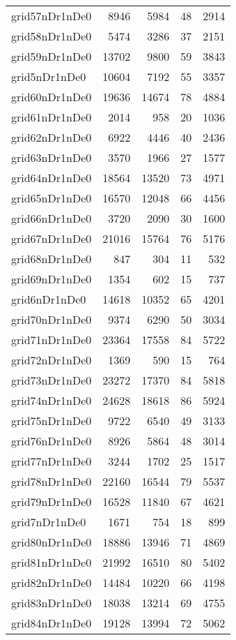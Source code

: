 \begin{longtable}{lrrrr}
grid57nDr1nDe0 & 8946 & 5984 & 48 & 2914 \\
grid58nDr1nDe0 & 5474 & 3286 & 37 & 2151 \\
grid59nDr1nDe0 & 13702 & 9800 & 59 & 3843 \\
grid5nDr1nDe0 & 10604 & 7192 & 55 & 3357 \\
grid60nDr1nDe0 & 19636 & 14674 & 78 & 4884 \\
grid61nDr1nDe0 & 2014 & 958 & 20 & 1036 \\
grid62nDr1nDe0 & 6922 & 4446 & 40 & 2436 \\
grid63nDr1nDe0 & 3570 & 1966 & 27 & 1577 \\
grid64nDr1nDe0 & 18564 & 13520 & 73 & 4971 \\
grid65nDr1nDe0 & 16570 & 12048 & 66 & 4456 \\
grid66nDr1nDe0 & 3720 & 2090 & 30 & 1600 \\
grid67nDr1nDe0 & 21016 & 15764 & 76 & 5176 \\
grid68nDr1nDe0 & 847 & 304 & 11 & 532 \\
grid69nDr1nDe0 & 1354 & 602 & 15 & 737 \\
grid6nDr1nDe0 & 14618 & 10352 & 65 & 4201 \\
grid70nDr1nDe0 & 9374 & 6290 & 50 & 3034 \\
grid71nDr1nDe0 & 23364 & 17558 & 84 & 5722 \\
grid72nDr1nDe0 & 1369 & 590 & 15 & 764 \\
grid73nDr1nDe0 & 23272 & 17370 & 84 & 5818 \\
grid74nDr1nDe0 & 24628 & 18618 & 86 & 5924 \\
grid75nDr1nDe0 & 9722 & 6540 & 49 & 3133 \\
grid76nDr1nDe0 & 8926 & 5864 & 48 & 3014 \\
grid77nDr1nDe0 & 3244 & 1702 & 25 & 1517 \\
grid78nDr1nDe0 & 22160 & 16544 & 79 & 5537 \\
grid79nDr1nDe0 & 16528 & 11840 & 67 & 4621 \\
grid7nDr1nDe0 & 1671 & 754 & 18 & 899 \\
grid80nDr1nDe0 & 18886 & 13946 & 71 & 4869 \\
grid81nDr1nDe0 & 21992 & 16510 & 80 & 5402 \\
grid82nDr1nDe0 & 14484 & 10220 & 66 & 4198 \\
grid83nDr1nDe0 & 18038 & 13214 & 69 & 4755 \\
grid84nDr1nDe0 & 19128 & 13994 & 72 & 5062 \\

\end{longtable}
